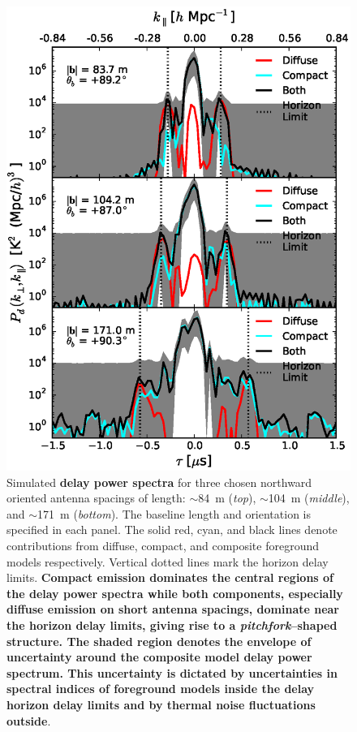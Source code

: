 \documentclass[preprint2,iop,numberedappendix,twocolappendix,appendixfloats]{emulateapj}
\begin{document}
\begin{figure}[htb]
\centering
\includegraphics[width=\linewidth]{figure8.eps}
\caption{Simulated {\bf delay power spectra} for three chosen northward oriented antenna spacings of length: $\sim$84~m ({\it top}), $\sim$104~m ({\it middle}), and $\sim$171~m ({\it bottom}). The baseline length and orientation is specified in each panel. The solid red, cyan, and black lines denote contributions from diffuse, compact, and composite foreground models respectively. Vertical dotted lines mark the horizon delay limits. {\bf Compact emission dominates the central regions of the delay power spectra while both components, especially diffuse emission on short antenna spacings, dominate near the horizon delay limits, giving rise to a {\it pitchfork}--shaped structure. The shaded region denotes the envelope of uncertainty around the composite model delay power spectrum. This uncertainty is dictated by uncertainties in spectral indices of foreground models inside the delay horizon delay limits and by thermal noise fluctuations outside}. \label{fig:pitchfork-baselines}}
\end{figure}
\end{document}
